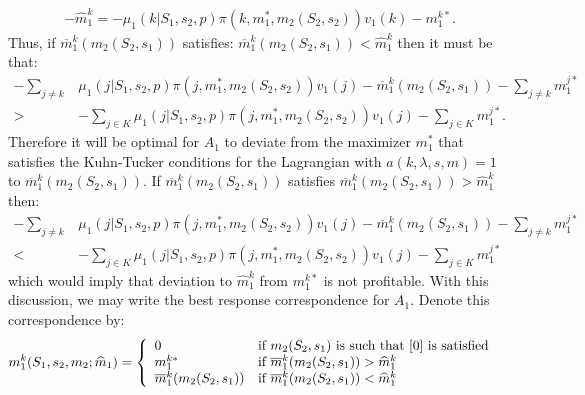 \documentclass[12pt]{article}
\begin{document}
\begin{align*}
-\widehat{m}_1^{k}=-\mu_1(k|S_1,s_2,p)\pi(k,m_1^*,m_2(S_2,s_2))v_1(k)-m_1^{k*}.
\end{align*}Thus, if $\overline{m}_1^k(m_2(S_2,s_1))$ satisfies: $\overline{m}_1^k(m_2(S_2,s_1))<\widehat{m}_1^k$ then it must be that:
\begin{align*}
-\sum_{j\neq k}&\mu_1(j|S_1,s_2,p)\pi(j,m_1^*,m_2(S_2,s_2))v_1(j)-\overline{m}_1^k(m_2(S_2,s_1))-\sum_{j\neq k}m_1^{j*}\\
>&-\sum_{j\in K}\mu_1(j|S_1,s_2,p)\pi(j,m_1^*,m_2(S_2,s_2))v_1(j)-\sum_{j\in K}m_1^{j*}.
\end{align*}Therefore it will be optimal for $A_1$ to deviate from the maximizer $m_1^*$ that satisfies the Kuhn-Tucker conditions for the Lagrangian with $a(k,\lambda,s,m)=1$ to $\overline{m}_1^k(m_2(S_2,s_1))$.  If $\overline{m}_1^k(m_2(S_2,s_1))$ satisfies $\overline{m}_1^k(m_2(S_2,s_1))>\widehat{m}_1^k$ then:
\begin{align*}
-\sum_{j\neq k}&\mu_1(j|S_1,s_2,p)\pi(j,m_1^*,m_2(S_2,s_2))v_1(j)-\overline{m}_1^k(m_2(S_2,s_1))-\sum_{j\neq k}m_1^{j*}\\
<&-\sum_{j\in K}\mu_1(j|S_1,s_2,p)\pi(j,m_1^*,m_2(S_2,s_2))v_1(j)-\sum_{j\in K}m_1^{j*}
\end{align*}which would imply that deviation to $\widehat{m}_1^k$ from $m_1^{k*}$ is not profitable.  With this discussion, we may write the best response correspondence for $A_1$.  Denote this correspondence by: 
\begin{align*}
m^k_1(S_1,s_2,m_2;\widehat{m}_1)&=\left\{\begin{array}{ll}
0&\mbox{if }m_2(S_2,s_1)\mbox{ is such that }\eqref{0}\mbox{ is satisfied}\\
m_1^{k*}&\mbox{if }\overline{m}_1^k(m_2(S_2,s_1))>\widehat{m}_1^k\\
\overline{m}_1^k(m_2(S_2,s_1))&\mbox{if }\overline{m}_1^k(m_2(S_2,s_1))<\widehat{m}_1^k\\
\end{array}\right.
\end{align*}

\end{document}
